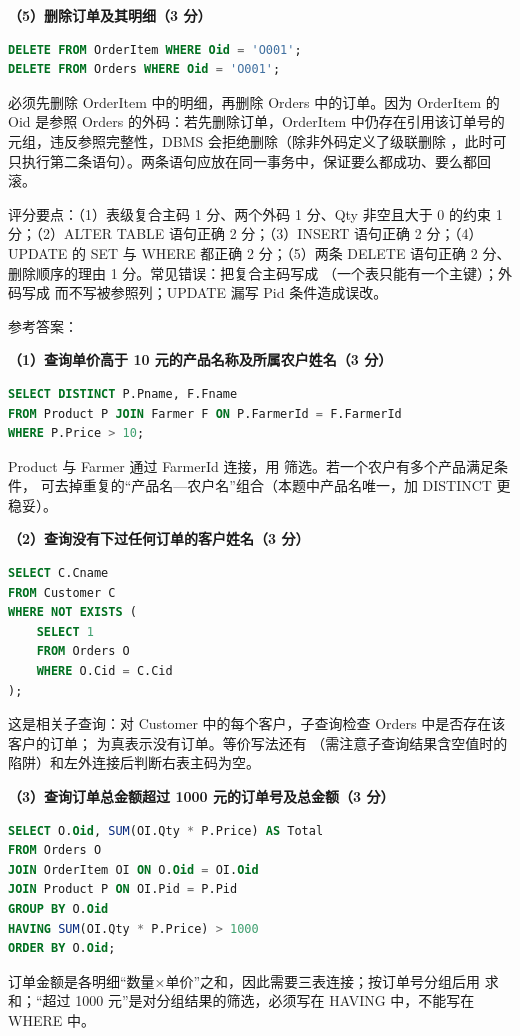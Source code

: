 \documentclass[a4paper,11pt]{article}
\begin{document}
\textbf{（5）删除订单及其明细（3 分）}
\begin{lstlisting}[language=SQL]
DELETE FROM OrderItem WHERE Oid = 'O001';
DELETE FROM Orders WHERE Oid = 'O001';
\end{lstlisting}
必须先删除 OrderItem 中的明细，再删除 Orders 中的订单。因为 OrderItem 的 Oid 是参照 Orders 的外码：若先删除订单，OrderItem 中仍存在引用该订单号的元组，违反参照完整性，DBMS 会拒绝删除（除非外码定义了级联删除 ，此时可只执行第二条语句）。两条语句应放在同一事务中，保证要么都成功、要么都回滚。
\begin{analysis}评分要点：（1）表级复合主码 1 分、两个外码 1 分、Qty 非空且大于 0 的约束 1 分；（2）ALTER TABLE 语句正确 2 分；（3）INSERT 语句正确 2 分；（4）UPDATE 的 SET 与 WHERE 都正确 2 分；（5）两条 DELETE 语句正确 2 分、删除顺序的理由 1 分。常见错误：把复合主码写成 （一个表只能有一个主键）；外码写成  而不写被参照列；UPDATE 漏写 Pid 条件造成误改。\end{analysis}

\q 参考答案：

\textbf{（1）查询单价高于 10 元的产品名称及所属农户姓名（3 分）}
\begin{lstlisting}[language=SQL]
SELECT DISTINCT P.Pname, F.Fname
FROM Product P JOIN Farmer F ON P.FarmerId = F.FarmerId
WHERE P.Price > 10;
\end{lstlisting}
Product 与 Farmer 通过 FarmerId 连接，用  筛选。若一个农户有多个产品满足条件， 可去掉重复的“产品名—农户名”组合（本题中产品名唯一，加 DISTINCT 更稳妥）。

\textbf{（2）查询没有下过任何订单的客户姓名（3 分）}
\begin{lstlisting}[language=SQL]
SELECT C.Cname
FROM Customer C
WHERE NOT EXISTS (
    SELECT 1
    FROM Orders O
    WHERE O.Cid = C.Cid
);
\end{lstlisting}
这是相关子查询：对 Customer 中的每个客户，子查询检查 Orders 中是否存在该客户的订单； 为真表示没有订单。等价写法还有 （需注意子查询结果含空值时的陷阱）和左外连接后判断右表主码为空。

\textbf{（3）查询订单总金额超过 1000 元的订单号及总金额（3 分）}
\begin{lstlisting}[language=SQL]
SELECT O.Oid, SUM(OI.Qty * P.Price) AS Total
FROM Orders O
JOIN OrderItem OI ON O.Oid = OI.Oid
JOIN Product P ON OI.Pid = P.Pid
GROUP BY O.Oid
HAVING SUM(OI.Qty * P.Price) > 1000
ORDER BY O.Oid;
\end{lstlisting}
订单金额是各明细“数量×单价”之和，因此需要三表连接；按订单号分组后用  求和；“超过 1000 元”是对分组结果的筛选，必须写在 HAVING 中，不能写在 WHERE 中。
\end{document}
